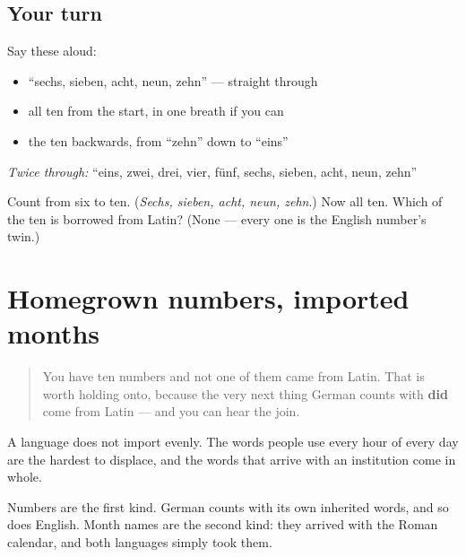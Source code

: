 \subsection*{Your turn}
Say these aloud:

\begin{itemize}
\raggedright
  \item \textquotedblleft{}sechs, sieben, acht, neun, zehn\textquotedblright{} — straight through
  \item all ten from the start, in one breath if you can
  \item the ten backwards, from \textquotedblleft{}zehn\textquotedblright{} down to \textquotedblleft{}eins\textquotedblright{}
\end{itemize}

\emph{Twice through:} \textquotedblleft{}eins, zwei, drei, vier, fünf, sechs, sieben, acht, neun, zehn\textquotedblright{}

\begin{tcolorbox}[breakable,colback=teal!4,colframe=teal!35!black,title={Before you move on}]
Count from six to ten. (\emph{Sechs, sieben, acht, neun, zehn}.) Now all ten. Which of the ten is borrowed from Latin? (None — every one is the English number's twin.)
\end{tcolorbox}
\section[(homegrown numbers, imported months)]{Homegrown numbers, imported months}

\label{lesson:GE-C06-monate-latein}



\begin{quote}
You have ten numbers and not one of them came from Latin. That is worth holding onto, because the very next thing German counts with \textbf{did} come from Latin — and you can hear the join.
\end{quote}

\begin{grammarlens}[title={Grammar Lens: a language keeps some words and buys others}]
A language does not import evenly. The words people use every hour of every day are the hardest to displace, and the words that arrive with an institution come in whole.

Numbers are the first kind. German counts with its own inherited words, and so does English. Month names are the second kind: they arrived with the Roman calendar, and both languages simply took them.
\end{grammarlens}

